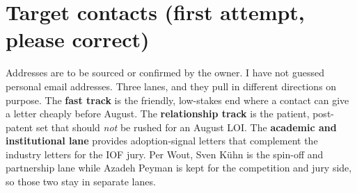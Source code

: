 \documentclass[11pt,a4paper]{article}
\begin{document}
\section{Target contacts (first attempt, please correct)}
Addresses are to be sourced or confirmed by the owner. I have not guessed personal email addresses. Three
lanes, and they pull in different directions on purpose. The \textbf{fast track} is the friendly,
low-stakes end where a contact can give a letter cheaply before August. The \textbf{relationship track} is
the patient, post-patent set that should \emph{not} be rushed for an August LOI. The \textbf{academic and
institutional lane} provides adoption-signal letters that complement the industry letters for the IOF jury.
Per Wout, Sven K\"uhn is the spin-off and partnership lane while Azadeh Peyman is kept for the competition
and jury side, so those two stay in separate lanes.
\end{document}
